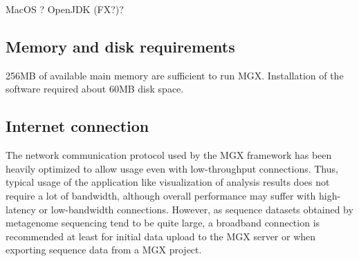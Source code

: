 MacOS ? OpenJDK (FX?)?

\subsection{Memory and disk requirements}

256MB of available main memory are sufficient to run MGX. Installation of the software
required about 60MB disk space.

\subsection{Internet connection}

The network communication protocol used by the MGX framework has been heavily optimized to
allow usage even with low-throughput connections. Thus, typical usage of the application
like visualization of analysis results does not require a lot of bandwidth, although
overall performance may suffer with high-latency or low-bandwidth connections. However, as
sequence datasets obtained by metagenome sequencing tend to be quite large, a broadband 
connection is recommended at least for initial data upload to the MGX server or when exporting
sequence data from a MGX project.



